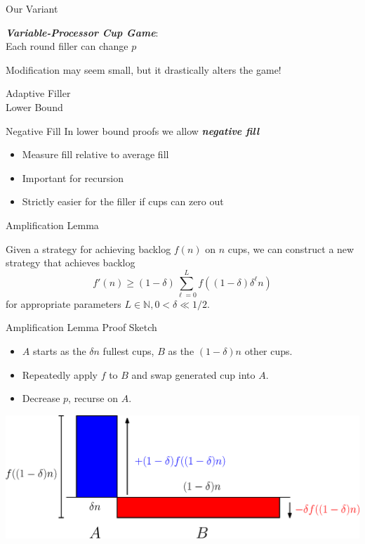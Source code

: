 \documentclass[xcolor=x11names, svgnames, rgb]{beamer}
\newcommand{\defn}[1]       {{\textit{\textbf{\boldmath #1}}}}
\begin{document}
\begin{frame}[t]{Our Variant}
  \begin{definition}
    \defn{Variable-Processor Cup Game}: \\
    Each round filler can change $p$ 
  \end{definition}

\vspace{1cm}
Modification may seem small, but it drastically
alters the game!

\end{frame}

\begin{frame}[c]{}
\begin{center}
\Huge Adaptive Filler\\ Lower Bound
\end{center}
\end{frame}

\begin{frame}[t]{Negative Fill}
  In lower bound proofs we allow \defn{negative fill}
  \begin{itemize}
    \item Measure fill relative to average fill
    \item Important for recursion 
    \item Strictly easier for the filler if cups can zero out
  \end{itemize}
\end{frame}

\begin{frame}[t]{Amplification Lemma}
  \begin{lemma}
    Given a strategy for achieving backlog $f(n)$ on $n$ cups, we can construct a new strategy that achieves backlog 
    $$f'(n) \ge (1-\delta)\sum_{\ell=0}^L f((1-\delta)\delta^\ell n)$$
    for appropriate parameters $L\in\mathbb{N}, 0<\delta\ll 1/2$.
  \end{lemma}
\end{frame}

\begin{frame}[t]{Amplification Lemma Proof Sketch}
  \begin{itemize}
    \item $A$ starts as the $\delta n$ fullest cups, $B$ as the $(1-\delta)n$ other cups.
    \item Repeatedly apply $f$ to $B$ and swap generated cup into $A$. 
    \item Decrease $p$, recurse on $A$.
  \end{itemize} 
  \vspace{0.5cm}
  \includegraphics[width=\linewidth]{amplificationImgs/delta_one_minus_delta.eps}
\end{frame}
\end{document}
